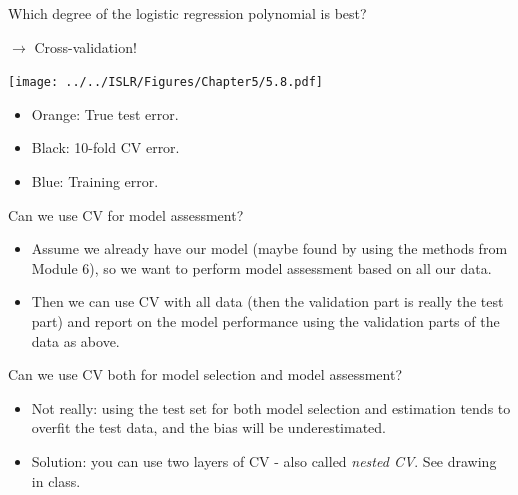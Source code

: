 \documentclass[
  10pt,
  ignorenonframetext,
]{beamer}
\providecommand{\tightlist}{%
  \setlength{\itemsep}{0pt}\setlength{\parskip}{0pt}}
\begin{document}
\begin{frame}
Which degree of the logistic regression polynomial is best?

\(\rightarrow\) Cross-validation!

\centering

\texttt{[image: ../../ISLR/Figures/Chapter5/5.8.pdf]}

\flushleft

\begin{itemize}
\tightlist
\item
  Orange: True test error.
\item
  Black: 10-fold CV error.
\item
  Blue: Training error.
\end{itemize}
\end{frame}

\begin{frame}
\begin{block}{Can we use CV for model assessment?}
\protect\hypertarget{can-we-use-cv-for-model-assessment}{}
\vspace{2mm}

\begin{itemize}
\item
  Assume we already have our model (maybe found by using the methods
  from Module 6), so we want to perform model assessment based on all
  our data.
\item
  Then we can use CV with all data (then the validation part is really
  the test part) and report on the model performance using the
  validation parts of the data as above.
\end{itemize}

\vspace{2mm}
\end{block}

\begin{block}{Can we use CV both for model selection and model
assessment?}
\protect\hypertarget{can-we-use-cv-both-for-model-selection-and-model-assessment}{}
\vspace{2mm}

\begin{itemize}
\item
  Not really: using the test set for both model selection and estimation
  tends to overfit the test data, and the bias will be underestimated.
\item
  Solution: you can use two layers of CV - also called \emph{nested CV}.
  See drawing in class.
\end{itemize}
\end{block}
\end{frame}
\end{document}

